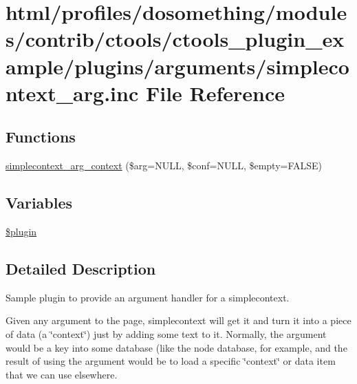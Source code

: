 \hypertarget{simplecontext__arg_8inc}{
\section{html/profiles/dosomething/modules/contrib/ctools/ctools\_\-plugin\_\-example/plugins/arguments/simplecontext\_\-arg.inc File Reference}
\label{simplecontext__arg_8inc}
}
\subsection*{Functions}
\begin{DoxyCompactItemize}
\item 
\hyperlink{simplecontext__arg_8inc_a4c6318fc0e6cfeb71d9a689daf023b47}{simplecontext\_\-arg\_\-context} (\$arg=NULL, \$conf=NULL, \$empty=FALSE)
\end{DoxyCompactItemize}
\subsection*{Variables}
\begin{DoxyCompactItemize}
\item 
\hyperlink{simplecontext__arg_8inc_ada8a7130088351710bb02ed622d6bf65}{\$plugin}
\end{DoxyCompactItemize}


\subsection{Detailed Description}
Sample plugin to provide an argument handler for a simplecontext.

Given any argument to the page, simplecontext will get it and turn it into a piece of data (a \char`\"{}context\char`\"{}) just by adding some text to it. Normally, the argument would be a key into some database (like the node database, for example, and the result of using the argument would be to load a specific \char`\"{}context\char`\"{} or data item that we can use elsewhere. 

